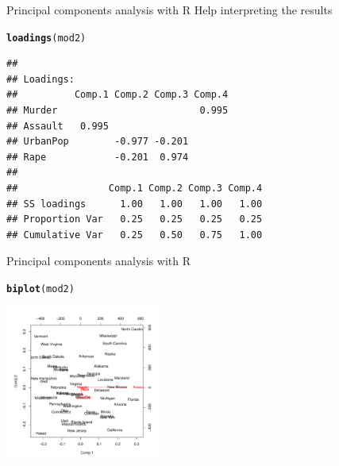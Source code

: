 \documentclass[10pt,xcolor=dvipsnames]{beamer}\usepackage[]{graphicx}\usepackage[]{color}
\makeatletter
\newcommand{\hlstd}[1]{\textcolor[rgb]{0.345,0.345,0.345}{#1}}%
\newcommand{\hlkwd}[1]{\textcolor[rgb]{0.737,0.353,0.396}{\textbf{#1}}}%
\newenvironment{kframe}{%
 \def\at@end@of@kframe{}%
 \ifinner\ifhmode%
  \def\at@end@of@kframe{\end{minipage}}%
  \begin{minipage}{\columnwidth}%
 \fi\fi%
 \def\FrameCommand##1{\hskip\@totalleftmargin \hskip-\fboxsep
 \colorbox{shadecolor}{##1}\hskip-\fboxsep
     \hskip-\linewidth \hskip-\@totalleftmargin \hskip\columnwidth}%
 \MakeFramed {\advance\hsize-\width
   \@totalleftmargin\z@ \linewidth\hsize
   \@setminipage}}%
 {\par\unskip\endMakeFramed%
 \at@end@of@kframe}
\newenvironment{knitrout}{}{} %
\makeatother
\begin{document}
\begin{frame}{Principal components analysis with R}
\noindent Help interpreting the results
\begin{knitrout}\footnotesize
{}\color{fgcolor}\begin{kframe}
\begin{alltt}
\hlkwd{loadings}\hlstd{(mod2)}
\end{alltt}
\begin{verbatim}
## 
## Loadings:
##          Comp.1 Comp.2 Comp.3 Comp.4
## Murder                         0.995
## Assault   0.995                     
## UrbanPop        -0.977 -0.201       
## Rape            -0.201  0.974       
## 
##                Comp.1 Comp.2 Comp.3 Comp.4
## SS loadings      1.00   1.00   1.00   1.00
## Proportion Var   0.25   0.25   0.25   0.25
## Cumulative Var   0.25   0.50   0.75   1.00
\end{verbatim}
\end{kframe}
\end{knitrout}
\end{frame}


\begin{frame}{Principal components analysis with R}

\begin{knitrout}\footnotesize
{}\color{fgcolor}\begin{kframe}
\begin{alltt}
\hlkwd{biplot}\hlstd{(mod2)}
\end{alltt}
\end{kframe}

{\centering \includegraphics[width=2in]{figure/pcaPlot3-1} 

}



\end{knitrout}
\end{frame}
\end{document}
